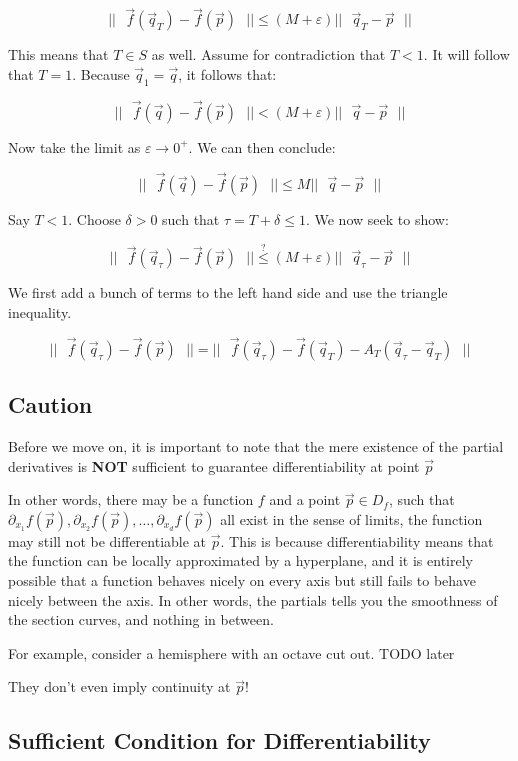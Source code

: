 \documentclass [12 pt, twoside] {book}
\newcommand\+{\text{ }}
\newcommand{\vfofpv}{\vec{f}(\vec{p})}
\begin{document}
$$ ||\+\vec{f}(\vec{q}_T) - \vfofpv\+|| \leq (M + \varepsilon) ||\+\vec{q}_T
- \vec{p}\+||$$

This means that $T \in S$ as well. Assume for contradiction that $T < 1$. It
will follow that $T = 1$. Because $\vec{q}_1 = \vec{q}$, it follows that:

$$ ||\+\vec{f}(\vec{q}) - \vfofpv\+|| < (M + \varepsilon) ||\+\vec{q} - \vec{p}\+||$$

Now take the limit as $\varepsilon \to 0^+$. We can then conclude:

$$ ||\+\vec{f}(\vec{q}) - \vfofpv\+|| \leq M ||\+\vec{q} - \vec{p}\+||$$

Say $T < 1$. Choose $\delta > 0$ such that $\tau = T + \delta \leq 1$. We now
seek to show:

$$ ||\+\vec{f}(\vec{q}_{\tau}) - \vec{f}(\vec{p})\+|| \overset{?}{\leq} (M +
\varepsilon) ||\+\vec{q}_{\tau} - \vec{p}\+||$$

We first add a bunch of terms to the left hand side and use the triangle
inequality.

$$ ||\+\vec{f}(\vec{q}_{\tau}) - \vec{f}(\vec{p})\+|| =
||\+\vec{f}(\vec{q}_{\tau}) - \vec{f}(\vec{q}_T) - A_T(\vec{q}_{\tau} -
\vec{q}_T)\+||$$

\subsection{Caution}
Before we move on, it is important to note that the mere existence of the
partial derivatives is \textbf{NOT} sufficient to guarantee differentiability at
point $\vec{p}$

In other words, there may be a function $f$ and a point $\vec{p} \in D_f$, such
that $\partial_{x_1} f(\vec{p}), \partial_{x_2} f(\vec{p}), \dots,
\partial_{x_d} f(\vec{p})$ all exist in the sense of limits, the function may
still not be differentiable at $\vec{p}$. This is because differentiability
means that the function can be locally approximated by a hyperplane, and it is
entirely possible that a function behaves nicely on every axis but still fails
to behave nicely between the axis. In other words, the partials tells you the
smoothness of the section curves, and nothing in between.

For example, consider a hemisphere with an octave cut out. TODO later

They don't even imply continuity at $\vec{p}$!

\subsection{Sufficient Condition for Differentiability}
\end{document}
